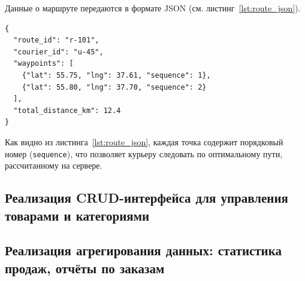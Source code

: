 Данные о маршруте передаются в формате JSON (см. листинг~\ref{lst:route_json}).

\begin{lstlisting}[float, floatplacement=ht!, caption={Структура данных оптимизированного маршрута}, label={lst:route_json}]
{
  "route_id": "r-101",
  "courier_id": "u-45",
  "waypoints": [
    {"lat": 55.75, "lng": 37.61, "sequence": 1},
    {"lat": 55.80, "lng": 37.70, "sequence": 2}
  ],
  "total_distance_km": 12.4
}
\end{lstlisting}

Как видно из листинга~\ref{lst:route_json}, каждая точка содержит порядковый
номер (\texttt{sequence}), что позволяет курьеру следовать по оптимальному пути,
рассчитанному на сервере.

\subsection{Реализация CRUD-интерфейса для управления товарами и категориями}

\subsection{Реализация агрегирования данных: статистика продаж, отчёты по заказам}
